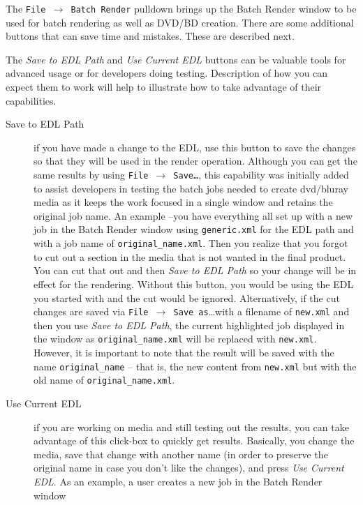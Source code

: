 The \texttt{File $\rightarrow$ Batch Render} pulldown brings up the Batch Render window to be used for batch rendering as well as DVD/BD creation.  There are some additional buttons that can save time and mistakes.  These are described next.

The \textit{Save to EDL Path} and \textit{Use Current EDL} buttons can be valuable tools for advanced usage or for developers doing testing.  Description of how you can expect them to work will help to illustrate how to take advantage of their capabilities.

\begin{description}
    \item[Save to EDL Path] if you have made a change to the EDL, use this button to save the changes so
    that they will be used in the render operation.  Although you can get the same results by using
    \texttt{File  $\rightarrow$  Save\dots}, this capability was initially added to assist developers in testing the batch jobs needed to create dvd/bluray media as it keeps the work focused in a single window and retains the original
    job name.  An example --you have everything all set up with a new job in the Batch Render window 
    using \texttt{generic.xml} for the EDL path and with a job name of \texttt{original\_name.xml}.  Then you realize
    that you forgot to cut out a section in the media that is not wanted in the final product.  You can cut 
    that out and then \textit{Save to EDL Path} so your change will be in effect for the rendering.  Without this
    button, you would be using the EDL you started with and the cut would be ignored.  Alternatively, if 
    the cut changes are saved via \texttt{File  $\rightarrow$  Save as}\dots with a filename of \texttt{new.xml} and then you use \textit{Save to EDL Path}, the current highlighted job displayed in the window as \texttt{original\_name.xml} will be 
    replaced with \texttt{new.xml}.  However, it is important to note that the result will be saved with the name
    \texttt{original\_name} – that is, the new content from \texttt{new.xml} but with the old name of \texttt{original\_name.xml}.
    \item[Use Current EDL] if you are working on media and still testing out the results, you can take
    advantage of this click-box to quickly get results.  Basically, you change the media, save that change 
    with another name (in order to preserve the original name in case you don't like the changes), and
    press \textit{Use Current EDL}.  As an example, a user creates a new job in the Batch Render window

\end{description}
